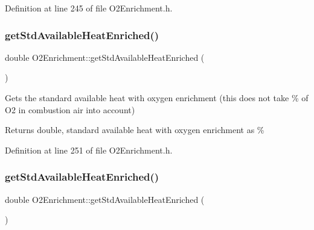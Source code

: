 Definition at line 245 of file O2\+Enrichment.\+h.

\mbox{\label{class_o2_enrichment_a24fd19f2aca20c7ba83061b832323ad6}} 
\subsubsection{\texorpdfstring{get\+Std\+Available\+Heat\+Enriched()}{getStdAvailableHeatEnriched()}\hspace{0.1cm}{\footnotesize\ttfamily [1/3]}}
{\footnotesize\ttfamily double O2\+Enrichment\+::get\+Std\+Available\+Heat\+Enriched (\begin{DoxyParamCaption}{ }\end{DoxyParamCaption})\hspace{0.3cm}{\ttfamily [inline]}}

Gets the standard available heat with oxygen enrichment (this does not take \% of O2 in combustion air into account) \begin{DoxyReturn}{Returns}
double, standard available heat with oxygen enrichment as \% 
\end{DoxyReturn}


Definition at line 251 of file O2\+Enrichment.\+h.

\mbox{\label{class_o2_enrichment_a24fd19f2aca20c7ba83061b832323ad6}} 
\subsubsection{\texorpdfstring{get\+Std\+Available\+Heat\+Enriched()}{getStdAvailableHeatEnriched()}\hspace{0.1cm}{\footnotesize\ttfamily [2/3]}}
{\footnotesize\ttfamily double O2\+Enrichment\+::get\+Std\+Available\+Heat\+Enriched (\begin{DoxyParamCaption}{ }\end{DoxyParamCaption})\hspace{0.3cm}{\ttfamily [inline]}}

